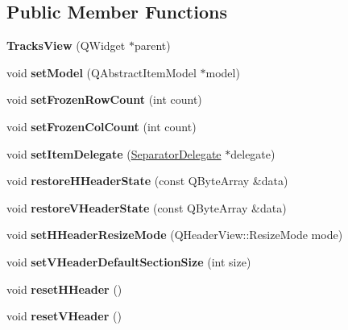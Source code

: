 \subsection*{Public Member Functions}
\begin{DoxyCompactItemize}
\item 
\mbox{\label{class_tracks_view_adf7e454aef7f58f262a2ddf2f7223494}} 
{\bfseries Tracks\+View} (Q\+Widget $\ast$parent)
\item 
\mbox{\label{class_tracks_view_ac85b6e00f11364731269280049c5c9ad}} 
void {\bfseries set\+Model} (Q\+Abstract\+Item\+Model $\ast$model)
\item 
\mbox{\label{class_tracks_view_a04695bc5286e8a9a56386e2da7da4fb4}} 
void {\bfseries set\+Frozen\+Row\+Count} (int count)
\item 
\mbox{\label{class_tracks_view_a4bbc9401dd6cd4bba0281f4ffdbecf54}} 
void {\bfseries set\+Frozen\+Col\+Count} (int count)
\item 
\mbox{\label{class_tracks_view_aa2b31e9ec99549f1ee6a309069ff6f0e}} 
void {\bfseries set\+Item\+Delegate} (\hyperlink{class_separator_delegate}{Separator\+Delegate} $\ast$delegate)
\item 
\mbox{\label{class_tracks_view_ae9fe96eb9cf98ef1027bf2878078abfe}} 
void {\bfseries restore\+H\+Header\+State} (const Q\+Byte\+Array \&data)
\item 
\mbox{\label{class_tracks_view_a3d6f12e59758289d7b1e1bc6d91a832d}} 
void {\bfseries restore\+V\+Header\+State} (const Q\+Byte\+Array \&data)
\item 
\mbox{\label{class_tracks_view_ae49a66aee45ee90a8c308a332e2fcbbb}} 
void {\bfseries set\+H\+Header\+Resize\+Mode} (Q\+Header\+View\+::\+Resize\+Mode mode)
\item 
\mbox{\label{class_tracks_view_a105e5758754075642e3ebfea716b222b}} 
void {\bfseries set\+V\+Header\+Default\+Section\+Size} (int size)
\item 
\mbox{\label{class_tracks_view_af9cc0c1e176370fffec64a66a5dbf418}} 
void {\bfseries reset\+H\+Header} ()
\item 
\mbox{\label{class_tracks_view_ade8d289614e121a1b0908ef0b52299e3}} 
void {\bfseries reset\+V\+Header} ()
\end{DoxyCompactItemize}
